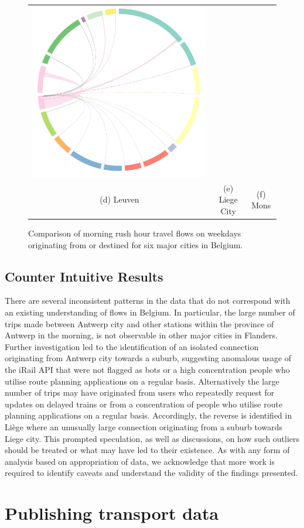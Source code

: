 \documentclass{sig-alternate}
\begin{document}
\begin{figure}[t]
\begin{tabular}{ccc}
  \includegraphics[width=.33\textwidth]{wd-mons.pdf}\\ 
  (d) Leuven&(e) Liege City&(f) Mons\\
\end{tabular}
\label{fig:cities}
\centering
\caption{Comparison of morning rush hour travel flows on weekdays originating from or destined for six major cities in Belgium.}
\end{figure}


\subsection{Counter Intuitive Results}

There are several inconsistent patterns in the data that do not correspond with an existing understanding of flows in Belgium.
In particular, the large number of trips made between Antwerp city and other stations within the province of Antwerp in the morning, is not observable in other major cities in Flanders.
Further investigation led to the identification of an isolated connection originating from Antwerp city towards a suburb, suggesting anomalous usage of the iRail API that were not flagged as bots or a high concentration people who utilise route planning applications on a regular basis.
Alternatively the large number of trips may have originated from users who repeatedly request for updates on delayed trains or from a concentration of people who utilise route planning applications on a regular basis.
Accordingly, the reverse is identified in Liège where an unusually large connection originating from a suburb towards Liege city.
This prompted speculation, as well as discussions, on how such outliers should be treated or what may have led to their existence.
As with any form of analysis based on appropriation of data, we acknowledge that more work is required to identify caveats and understand the validity of the findings presented.

\section{Publishing transport data}
\label{sec:publishing}
\end{document}
